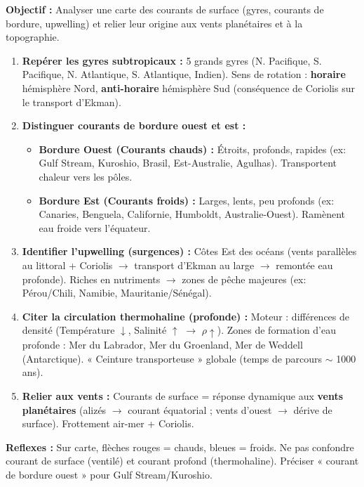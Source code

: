 \documentclass[11pt]{article}
\newcommand{\cle}[1]{{\popxbold\color{popdark}#1}}
\begin{document}
\begin{methode}
\textbf{Objectif :} Analyser une carte des courants de surface (gyres, courants de bordure, upwelling) et relier leur origine aux vents planétaires et à la topographie.
\begin{enumerate}
    \item \textbf{Repérer les gyres subtropicaux :} 5 grands gyres (N. Pacifique, S. Pacifique, N. Atlantique, S. Atlantique, Indien). Sens de rotation : \textbf{horaire} hémisphère Nord, \textbf{anti-horaire} hémisphère Sud (conséquence de Coriolis sur le transport d'Ekman).
    \item \textbf{Distinguer courants de bordure ouest et est :}
    \begin{itemize}
        \item \textbf{Bordure Ouest (Courants chauds) :} Étroits, profonds, rapides (ex: \cle{Gulf Stream}, \cle{Kuroshio}, \cle{Brasil}, \cle{Est-Australie}, \cle{Agulhas}). Transportent chaleur vers les pôles.
        \item \textbf{Bordure Est (Courants froids) :} Larges, lents, peu profonds (ex: \cle{Canaries}, \cle{Benguela}, \cle{Californie}, \cle{Humboldt}, \cle{Australie-Ouest}). Ramènent eau froide vers l'équateur.
    \end{itemize}
    \item \textbf{Identifier l'upwelling (surgences) :} Côtes Est des océans (vents parallèles au littoral + Coriolis $\to$ transport d'Ekman au large $\to$ remontée eau profonde). Riches en nutriments $\to$ zones de pêche majeures (ex: Pérou/Chili, Namibie, Mauritanie/Sénégal).
    \item \textbf{Citer la circulation thermohaline (profonde) :} Moteur : différences de densité (Température $\downarrow$, Salinité $\uparrow$ $\to$ $\rho \uparrow$). Zones de formation d'eau profonde : Mer du Labrador, Mer du Groenland, Mer de Weddell (Antarctique). « Ceinture transporteuse » globale (temps de parcours $\sim$ 1000 ans).
    \item \textbf{Relier aux vents :} Courants de surface = réponse dynamique aux \textbf{vents planétaires} (alizés $\to$ courant équatorial ; vents d'ouest $\to$ dérive de surface). Frottement air-mer + Coriolis.
\end{enumerate}
\textbf{Reflexes :} Sur carte, flèches rouges = chauds, bleues = froids. Ne pas confondre courant de surface (ventilé) et courant profond (thermohaline). Préciser « courant de bordure ouest » pour Gulf Stream/Kuroshio.
\end{methode}
\end{document}
